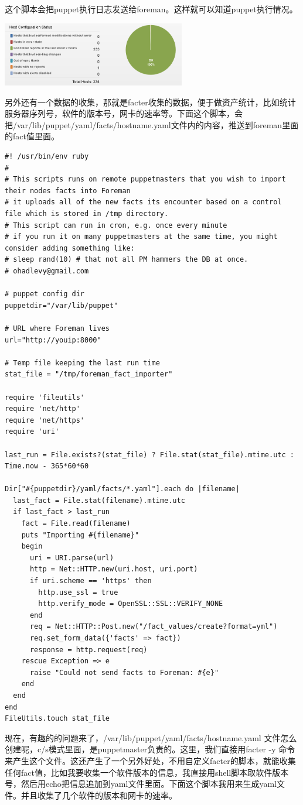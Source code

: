 这个脚本会把puppet执行日志发送给foreman。这样就可以知道puppet执行情况。
\begin{center}
\includegraphics[width=0.6\textwidth]{1.png}
\end{center}
\par
另外还有一个数据的收集，那就是facter收集的数据，便于做资产统计，比如统计服务器序列号，软件的版本号，网卡的速率等。下面这个脚本，会把/var/lib/puppet/yaml/facts/hostname.yaml文件内的内容，推送到foreman里面的fact值里面。
\codefont\tiny \begin{lstlisting}
#! /usr/bin/env ruby
#
# This scripts runs on remote puppetmasters that you wish to import their nodes facts into Foreman
# it uploads all of the new facts its encounter based on a control file which is stored in /tmp directory.
# This script can run in cron, e.g. once every minute
# if you run it on many puppetmasters at the same time, you might consider adding something like:
# sleep rand(10) # that not all PM hammers the DB at once.
# ohadlevy@gmail.com

# puppet config dir
puppetdir="/var/lib/puppet"

# URL where Foreman lives
url="http://youip:8000"

# Temp file keeping the last run time
stat_file = "/tmp/foreman_fact_importer"

require 'fileutils'
require 'net/http'
require 'net/https'
require 'uri'

last_run = File.exists?(stat_file) ? File.stat(stat_file).mtime.utc : Time.now - 365*60*60

Dir["#{puppetdir}/yaml/facts/*.yaml"].each do |filename|
  last_fact = File.stat(filename).mtime.utc
  if last_fact > last_run
    fact = File.read(filename)
    puts "Importing #{filename}"
    begin
      uri = URI.parse(url)
      http = Net::HTTP.new(uri.host, uri.port)
      if uri.scheme == 'https' then
        http.use_ssl = true
        http.verify_mode = OpenSSL::SSL::VERIFY_NONE
      end
      req = Net::HTTP::Post.new("/fact_values/create?format=yml")
      req.set_form_data({'facts' => fact})
      response = http.request(req)
    rescue Exception => e
      raise "Could not send facts to Foreman: #{e}"
    end
  end
end
FileUtils.touch stat_file

\end{lstlisting}
\fzsk\normalsize
现在，有趣的的问题来了，/var/lib/puppet/yaml/facts/hostname.yaml 文件怎么创建呢，c/s模式里面，是puppetmaster负责的。这里，我们直接用facter  -y 命令来产生这个文件。这还产生了一个另外好处，不用自定义facter的脚本，就能收集任何fact值，比如我要收集一个软件版本的信息，我直接用shell脚本取软件版本号，然后用echo把信息追加到yaml文件里面。下面这个脚本我用来生成yaml文件。并且收集了几个软件的版本和网卡的速率。

